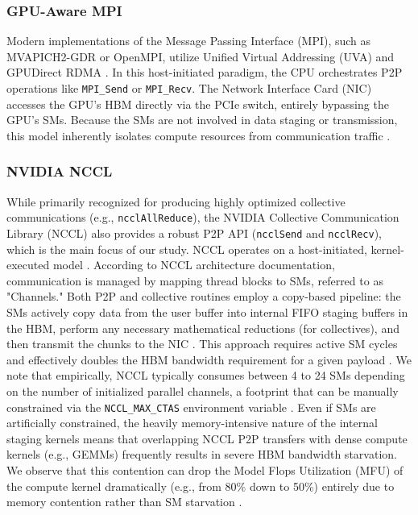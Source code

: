 \documentclass[twocolumn, secnumarabic, amssymb, nobibnotes, aps, prd, amsmath, nofootinbib]{revtex4-2}
\begin{document}
\subsubsection{GPU-Aware MPI}
Modern implementations of the Message Passing Interface (MPI), such as MVAPICH2-GDR or OpenMPI, utilize Unified Virtual Addressing (UVA) and GPUDirect RDMA \cite{potluri2013mvapich2, nvidia_gpudirect}. In this host-initiated paradigm, the CPU orchestrates P2P operations like \texttt{MPI\_Send} or \texttt{MPI\_Recv}. The Network Interface Card (NIC) accesses the GPU's HBM directly via the PCIe switch, entirely bypassing the GPU's SMs. Because the SMs are not involved in data staging or transmission, this model inherently isolates compute resources from communication traffic \cite{chu2020exploiting}.

\subsubsection{NVIDIA NCCL}
While primarily recognized for producing highly optimized collective communications (e.g., \texttt{ncclAllReduce}), the NVIDIA Collective Communication Library (NCCL) also provides a robust P2P API (\texttt{ncclSend} and \texttt{ncclRecv}), which is the main focus of our study. NCCL operates on a host-initiated, kernel-executed model \cite{nvidia_nccl_doc}. According to NCCL architecture documentation, communication is managed by mapping thread blocks to SMs, referred to as "Channels." Both P2P and collective routines employ a copy-based pipeline: the SMs actively copy data from the user buffer into internal FIFO staging buffers in the HBM, perform any necessary mathematical reductions (for collectives), and then transmit the chunks to the NIC \cite{meta2025ncclx, unat2024landscape}. This approach requires active SM cycles and effectively doubles the HBM bandwidth requirement for a given payload \cite{agrawal2024optimizing}. We note that empirically, NCCL typically consumes between 4 to 24 SMs depending on the number of initialized parallel channels, a footprint that can be manually constrained via the \texttt{NCCL\_MAX\_CTAS} environment variable \cite{nvidia_nccl_env}. Even if SMs are artificially constrained, the heavily memory-intensive nature of the internal staging kernels means that overlapping NCCL P2P transfers with dense compute kernels (e.g., GEMMs) frequently results in severe HBM bandwidth starvation. We observe that this contention can drop the Model Flops Utilization (MFU) of the compute kernel dramatically (e.g., from 80\% down to 50\%) entirely due to memory contention rather than SM starvation \cite{lee2025characterizing}.
\end{document}
